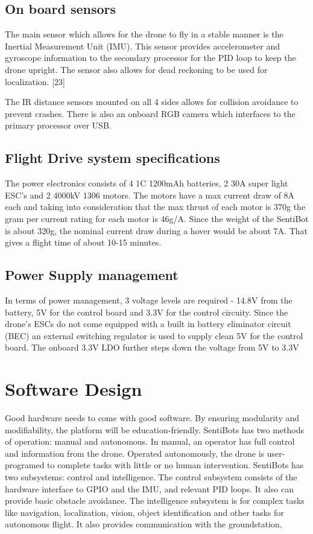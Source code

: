 \documentclass[12pt]{article}
\begin{document}
\subsection{On board sensors}

The main sensor which allows for the drone to fly in a stable manner is the Inertial Measurement Unit (IMU). This sensor provides accelerometer and gyroscope information to the secondary processor for the PID loop to keep the drone upright. The sensor also allows for dead reckoning to be used for localization. [23]

The IR distance sensors mounted on all 4 sides allows for collision avoidance to prevent crashes. There is also an onboard RGB camera which interfaces to the primary processor over USB. 


\subsection{Flight Drive system specifications}

The power electronics consists of 4 1C 1200mAh batteries, 2 30A super light ESC’s and 2 4000kV 1306 motors. The motors have a max current draw of 8A each and taking into consideration that the max thrust of each motor is 370g the gram per current rating for each motor is 46g/A. Since the weight of the SentiBot is about 320g, the nominal current draw during a hover would be about 7A. That gives a flight time of about 10-15 minutes. 

\subsection{Power Supply management}

In terms of power management, 3 voltage levels are required - 14.8V from the battery, 5V for the control board and 3.3V for the control circuity. Since the drone’s ESCs do not come equipped with a built in battery eliminator circuit (BEC) an external switching regulator is used to supply clean 5V for the control board. The onboard 3.3V LDO further steps down the voltage from 5V to 3.3V

\section{Software Design}

Good hardware needs to come with good software. By ensuring modularity and modifiability, the platform will be education-friendly. SentiBots has two methods of operation: manual and autonomous. In manual, an operator has full control and information from the drone. Operated autonomously, the drone is user-programed to complete tasks with little or no human intervention. SentiBots has two subsystems: control and intelligence. The control subsystem consists of the hardware interface to GPIO and the IMU, and relevant PID loops. It also can provide basic obstacle avoidance. The intelligence subsystem is for complex tasks like navigation, localization, vision, object identification and other tasks for autonomous flight. It also provides communication with the groundstation.
\end{document}
